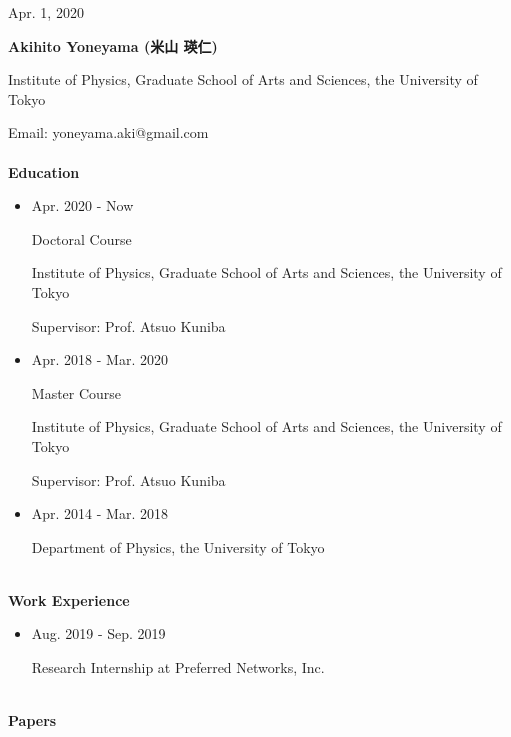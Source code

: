 \documentclass[dvipdfmx]{jsarticle}
\begin{document}
%
%
%
%
\begin{flushright}
Apr. 1, 2020
\end{flushright}
%
%
%
%
{\bf\Large Akihito Yoneyama (米山 瑛仁)}
\vspace{3mm}
\par
Institute of Physics, Graduate School of Arts and Sciences, the University of Tokyo
\par
Email: yoneyama.aki@gmail.com
%
%
%
%
{\ }\\\\
\vspace{3mm}
{\bf\large Education}
\vspace{-6mm}
\\\hrulefill
\begin{itemize}
\item
Apr. 2020 - Now
\par
Doctoral Course
\par
Institute of Physics, Graduate School of Arts and Sciences, the University of Tokyo
\par
Supervisor: Prof. Atsuo Kuniba
\item
Apr. 2018 - Mar. 2020
\par
Master Course
\par
Institute of Physics, Graduate School of Arts and Sciences, the University of Tokyo
\par
Supervisor: Prof. Atsuo Kuniba
\item
Apr. 2014 - Mar. 2018
\par
Department of Physics, the University of Tokyo
\end{itemize}
%
%
%
%
{\ }\\
\vspace{3mm}
{\bf\large Work Experience}
\vspace{-6mm}
\\\hrulefill
\begin{itemize}
\item
Aug. 2019 - Sep. 2019
\par
Research Internship at Preferred Networks, Inc.
\end{itemize}
%
%
%
%
{\ }\\
\vspace{3mm}
{\bf\large Papers}
\vspace{-6mm}
\\\hrulefill
\end{document}
